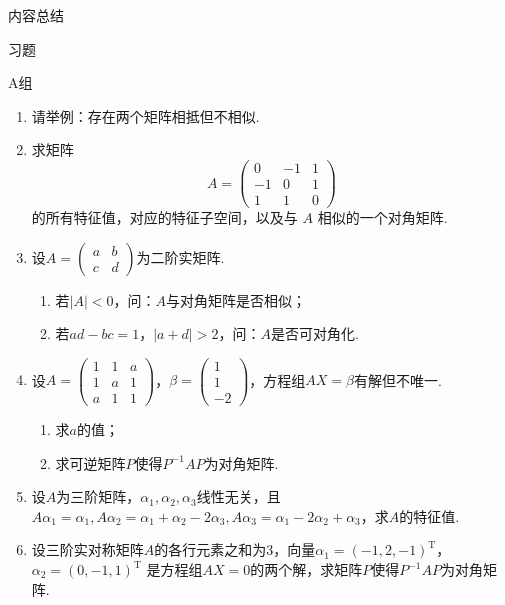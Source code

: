 \vspace{2ex}
\centerline{\heiti \Large 内容总结}

\vspace{2ex}

\centerline{\heiti \Large 习题}
\vspace{2ex}
{\kaishu }
\begin{flushright}
    \kaishu

\end{flushright}
\centerline{\heiti A组}
\begin{enumerate}
    \item 请举例：存在两个矩阵相抵但不相似.
    \item 求矩阵
    \[A=\left(\begin{array}{ccc}
	0 & -1 & 1 \\
	-1 & 0 & 1 \\
	1 & 1 & 0
	\end{array}\right)\]
	的所有特征值，对应的特征子空间，以及与 $A$ 相似的一个对角矩阵.
	\item 设$A=\begin{pmatrix}
		a & b \\ c & d
	\end{pmatrix}$为二阶实矩阵.
    \begin{enumerate}[label=(\arabic*)]
        \item 若$|A|<0$，问：$A$与对角矩阵是否相似；
        \item 若$ad-bc=1$，$|a+d|>2$，问：$A$是否可对角化.
    \end{enumerate}
	\item 设$A=\begin{pmatrix}
		1 & 1 & a \\ 1 & a & 1 \\ a & 1 & 1
	\end{pmatrix}$，$\beta=\begin{pmatrix}
		1 \\ 1 \\ -2
	\end{pmatrix}$，方程组$AX=\beta$有解但不唯一.
    \begin{enumerate}[label=(\arabic*)]
        \item 求$a$的值；
        \item 求可逆矩阵$P$使得$P^{-1}AP$为对角矩阵.
    \end{enumerate}
	\item 设$A$为三阶矩阵，$\alpha_1,\alpha_2,\alpha_3$线性无关，且
	$A\alpha_1=\alpha_1,A\alpha_2=\alpha_1+\alpha_2-2\alpha_3,A\alpha_3
	=\alpha_1-2\alpha_2+\alpha_3$，求$A$的特征值.
	\item 设三阶实对称矩阵$A$的各行元素之和为3，向量$\alpha_1=(-1,2,-1)^\mathrm{T}$，$\alpha_2=(0,-1,1)^\mathrm{T}$
	是方程组$AX=0$的两个解，求矩阵$P$使得$P^{-1}AP$为对角矩阵.
\end{enumerate}
